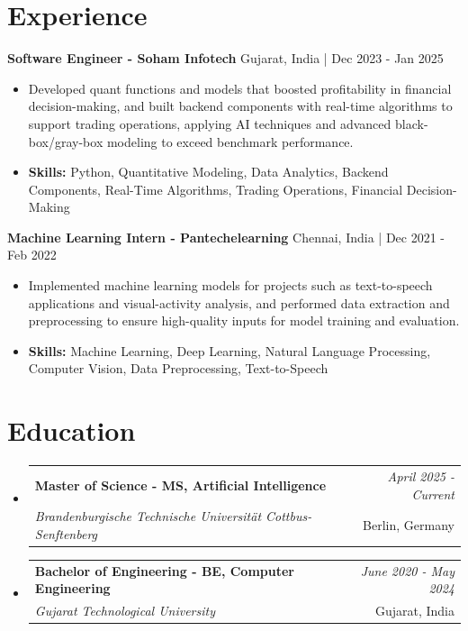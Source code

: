 \documentclass[a4paper,11pt]{article}
\makeatletter
\newcommand{\resumeSubheading}[4]{
\vspace{0.5mm}\item
    \begin{tabular*}{\linewidth}[t]{l@{\extracolsep{\fill}}r}
        \textbf{#1} & \textit{\footnotesize{#4}} \\
        \textit{\footnotesize{#3}} &  \footnotesize{#2}\\
    \end{tabular*}
    \vspace{-2.4mm}
}
\makeatother
\begin{document}
\section{\textbf{Experience}}


\vspace{1mm}
  \textbf{Software Engineer - Soham Infotech} \hfill Gujarat, India | Dec 2023 - Jan 2025
\vspace{-1.5mm} %
\begin{itemize}
  \item Developed quant functions and models that boosted profitability in financial decision-making, and built backend components with real-time algorithms to support trading operations, applying AI techniques and advanced black-box/gray-box modeling to exceed benchmark performance.

\vspace{-2mm}
  \item \textbf{Skills:} Python, Quantitative Modeling, Data Analytics, Backend Components, Real-Time Algorithms, Trading Operations, Financial Decision-Making
\end{itemize}

\vspace{1mm}
  \textbf{Machine Learning Intern - Pantechelearning} \hfill Chennai, India | Dec 2021 - Feb 2022
\vspace{-1.5mm} %
\begin{itemize}
  \item Implemented machine learning models for projects such as text-to-speech applications and visual-activity analysis, and performed data extraction and preprocessing to ensure high-quality inputs for model training and evaluation.
\vspace{-2mm}
  \item \textbf{Skills:} Machine Learning, Deep Learning, Natural Language Processing, Computer Vision, Data Preprocessing, Text-to-Speech
\end{itemize}\section{\textbf{Education}}
\vspace{-0.4mm}

\begin{itemize}[leftmargin=0.15in, label={}]
\resumeSubheading
{Master of Science - MS, Artificial Intelligence }{Berlin, Germany}
{Brandenburgische Technische Universität Cottbus-Senftenberg  }{April 2025 - Current}

\vspace{1.0mm} %
\resumeSubheading
{Bachelor of Engineering - BE, Computer Engineering  }{Gujarat, India}
{Gujarat Technological University }{June 2020 - May 2024}

\end{itemize}
\end{document}

